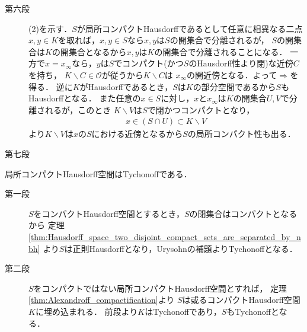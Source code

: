 \begin{prf}
\begin{description}
			\item[第六段] (2)を示す．$S$が局所コンパクトHausdorffであるとして任意に相異なる二点
				$x,y \in K$を取れば，$x,y \in S$なら$x,y$は$S$の開集合で分離されるが，
				$S$の開集合は$K$の開集合となるから$x,y$は$K$の開集合で分離されることになる．
				一方で$x = x_\infty$なら，$y$は$S$でコンパクト(かつ$S$のHausdorff性より閉)な近傍$C$を持ち，
				$K \backslash C \in \mathscr{O}$が従うから$K \backslash C$は
				$x_\infty$の開近傍となる．よって$\Longrightarrow$を得る．
				逆に$K$がHausdorffであるとき，$S$は$K$の部分空間であるから$S$もHausdorffとなる．
				また任意の$x \in S$に対し，$x$と$x_\infty$は$K$の開集合$U,V$で分離されるが，このとき
				$K \backslash V$は$S$で閉かつコンパクトとなり，
				\begin{align}
					x \in (S \cap U) \subset K \backslash V 
				\end{align}
				より$K \backslash V$は$x$の$S$における近傍となるから$S$の局所コンパクト性も出る．
				
			\item[第七段] 
				\QED
		\end{description}
	\end{prf}
	
	\begin{screen}
		\begin{thm}
		\label{thm:T_2_equals_to_T_3_in_locally_compact_spaces}
			局所コンパクトHausdorff空間はTychonoffである．
		\end{thm}
	\end{screen}
	
	\begin{prf}\mbox{}
		\begin{description}
			\item[第一段]
				$S$をコンパクトHausdorff空間とするとき，$S$の閉集合はコンパクトとなるから
				定理\ref{thm:Hausdorff_space_two_disjoint_compact_sets_are_separated_by_nbh}
				より$S$は正則Hausdorffとなり，Urysohnの補題よりTychonoffとなる．
				
			\item[第二段]
				$S$をコンパクトではない局所コンパクトHausdorff空間とすれば，
				定理\ref{thm:Alexandroff_compactification}より
				$S$は或るコンパクトHausdorff空間$K$に埋め込まれる．
				前段より$K$はTychonoffであり，$S$もTychonoffとなる．
				\QED
		\end{description}
	\end{prf}